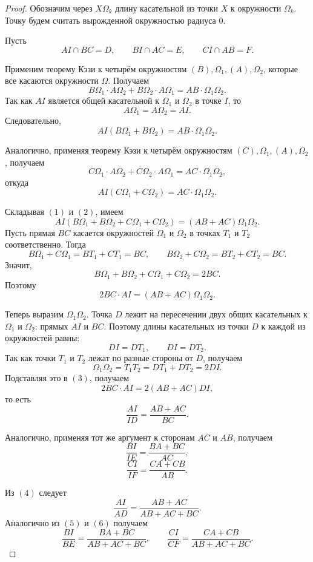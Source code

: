 \begin{proof}
    Обозначим через $X\Omega_k$ длину касательной из точки $X$ к окружности $\Omega_k$. Точку будем считать вырожденной окружностью радиуса $0$.

Пусть
\[
AI \cap BC = D,\qquad BI \cap AC = E,\qquad CI \cap AB = F.
\]

Применим теорему Кэзи к четырём окружностям $(B), \Omega_1, (A), \Omega_2$, которые все касаются окружности $\Omega$. Получаем
\[
B\Omega_1 \cdot A\Omega_2 + B\Omega_2 \cdot A\Omega_1
=
AB \cdot \Omega_1\Omega_2.
\]
Так как $AI$ является общей касательной к $\Omega_1$ и $\Omega_2$ в точке $I$, то
\[
A\Omega_1 = A\Omega_2 = AI.
\]
Следовательно,
\[
AI(B\Omega_1+B\Omega_2)=AB\cdot \Omega_1\Omega_2. \tag{1}
\]

Аналогично, применяя теорему Кэзи к четырём окружностям $(C), \Omega_1, (A), \Omega_2$, получаем
\[
C\Omega_1 \cdot A\Omega_2 + C\Omega_2 \cdot A\Omega_1
=
AC \cdot \Omega_1\Omega_2,
\]
откуда
\[
AI(C\Omega_1+C\Omega_2)=AC\cdot \Omega_1\Omega_2. \tag{2}
\]

Складывая $(1)$ и $(2)$, имеем
\[
AI(B\Omega_1+B\Omega_2+C\Omega_1+C\Omega_2)
=
(AB+AC)\Omega_1\Omega_2.
\]
Пусть прямая $BC$ касается окружностей $\Omega_1$ и $\Omega_2$ в точках $T_1$ и $T_2$ соответственно. Тогда
\[
B\Omega_1+C\Omega_1=BT_1+CT_1=BC,\qquad
B\Omega_2+C\Omega_2=BT_2+CT_2=BC.
\]
Значит,
\[
B\Omega_1+B\Omega_2+C\Omega_1+C\Omega_2=2BC.
\]
Поэтому
\[
2BC\cdot AI=(AB+AC)\Omega_1\Omega_2. \tag{3}
\]

\newpage

\hspace{3mm}

Теперь выразим $\Omega_1\Omega_2$. Точка $D$ лежит на пересечении двух общих касательных к $\Omega_1$ и $\Omega_2$: прямых $AI$ и $BC$. Поэтому длины касательных из точки $D$ к каждой из окружностей равны:
\[
DI=DT_1,\qquad DI=DT_2.
\]
Так как точки $T_1$ и $T_2$ лежат по разные стороны от $D$, получаем
\[
\Omega_1\Omega_2=T_1T_2=DT_1+DT_2=2DI.
\]
Подставляя это в $(3)$, получаем
\[
2BC\cdot AI=2(AB+AC)DI,
\]
то есть
\[
\dfrac{AI}{ID}=\dfrac{AB+AC}{BC}. \tag{4}
\]

Аналогично, применяя тот же аргумент к сторонам $AC$ и $AB$, получаем
\[
\dfrac{BI}{IE}=\dfrac{BA+BC}{AC}, \tag{5}
\]
\[
\dfrac{CI}{IF}=\dfrac{CA+CB}{AB}. \tag{6}
\]

Из $(4)$ следует
\[
\dfrac{AI}{AD}
=
\dfrac{AB+AC}{AB+AC+BC}.
\]
Аналогично из $(5)$ и $(6)$ получаем
\[
\dfrac{BI}{BE}
=
\dfrac{BA+BC}{AB+AC+BC},
\qquad
\dfrac{CI}{CF}
=
\dfrac{CA+CB}{AB+AC+BC}.
\]


\end{proof}
